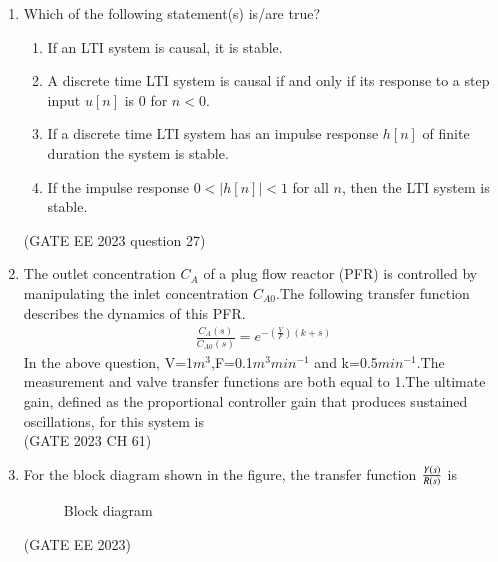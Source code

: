\begin{enumerate}[label=\thechapter.\arabic*,ref=\thechapter.\theenumi]
\item 
Which of the following statement(s) is/are true?
\begin{enumerate}[label=(\alph*)]
	\item If an LTI system is causal, it is stable.
	\item A discrete time LTI system is causal if and only if its response to a step input $u[n]$ is 0 for $n < 0$.
	\item If a discrete time LTI system has an impulse response $h[n]$ of finite duration the system is stable.
	\item If the impulse response $0 < |h[n]| < 1$ for all $n$, then the LTI system is stable.
\end{enumerate}
\hfill (GATE EE 2023 question 27)\\
\solution
\newpage

\item The outlet concentration $C_A$ of a plug flow reactor (PFR) is controlled by manipulating the inlet concentration $C_{A0}$.The following transfer function describes the dynamics of this PFR.
\begin{align*}
    \frac{C_{A}(s)}{C_{A0}(s)}=e^{-(\frac{V}{F})(k+s)}
\end{align*}
In the above question, V=1$m^3$,F=0.1$m^3$$min^{-1}$ and k=0.5$min^{-1}$.The measurement and valve transfer functions are both equal to 1.The ultimate gain, defined as the proportional controller gain that produces sustained oscillations, for this system is\\ \hfill{(GATE 2023 CH 61)}\\
\solution
\item For the block diagram shown in the figure, the transfer function $\frac{Y\left(s\right)}{R\left(s\right)}$ is \\
\begin{figure}[H]
    {}
    \caption{Block diagram}
    \label{fig:gate_ee_Q12_blockdiagram}
\end{figure}
\hfill (GATE EE 2023)\\
\solution
\newpage


\end{enumerate}
